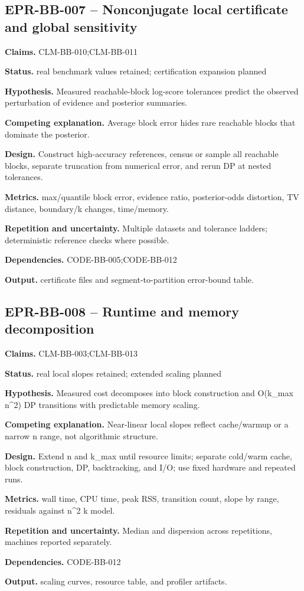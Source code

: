 \subsection{EPR-BB-007 -- Nonconjugate local certificate and global sensitivity}
\textbf{Claims.} CLM-BB-010;CLM-BB-011\par
\textbf{Status.} real benchmark values retained; certification expansion planned\par
\textbf{Hypothesis.} Measured reachable-block log-score tolerances predict the observed perturbation of evidence and posterior summaries.\par
\textbf{Competing explanation.} Average block error hides rare reachable blocks that dominate the posterior.\par
\textbf{Design.} Construct high-accuracy references, census or sample all reachable blocks, separate truncation from numerical error, and rerun DP at nested tolerances.\par
\textbf{Metrics.} max/quantile block error, evidence ratio, posterior-odds distortion, TV distance, boundary/k changes, time/memory.\par
\textbf{Repetition and uncertainty.} Multiple datasets and tolerance ladders; deterministic reference checks where possible.\par
\textbf{Dependencies.} CODE-BB-005;CODE-BB-012\par
\textbf{Output.} certificate files and segment-to-partition error-bound table.

\subsection{EPR-BB-008 -- Runtime and memory decomposition}
\textbf{Claims.} CLM-BB-003;CLM-BB-013\par
\textbf{Status.} real local slopes retained; extended scaling planned\par
\textbf{Hypothesis.} Measured cost decomposes into block construction and O(k\_max n\textasciicircum{}2) DP transitions with predictable memory scaling.\par
\textbf{Competing explanation.} Near-linear local slopes reflect cache/warmup or a narrow n range, not algorithmic structure.\par
\textbf{Design.} Extend n and k\_max until resource limits; separate cold/warm cache, block construction, DP, backtracking, and I/O; use fixed hardware and repeated runs.\par
\textbf{Metrics.} wall time, CPU time, peak RSS, transition count, slope by range, residuals against n\textasciicircum{}2 k model.\par
\textbf{Repetition and uncertainty.} Median and dispersion across repetitions, machines reported separately.\par
\textbf{Dependencies.} CODE-BB-012\par
\textbf{Output.} scaling curves, resource table, and profiler artifacts.

